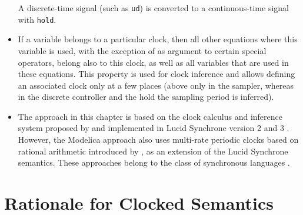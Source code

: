 \begin{itemize}
  A discrete-time signal (such as \lstinline!ud!) is converted to a continuous-time signal with \lstinline!hold!.
\item
  If a variable belongs to a particular clock, then all other equations where this variable is used, with the exception of as argument to certain special operators, belong also to this clock, as well as all variables that are used in these equations.
  This property is used for clock inference and allows defining an associated clock only at a few places (above only in the sampler, whereas in the discrete controller and the hold the sampling period is inferred).
\item
  The approach in this chapter is based on the clock calculus and inference system proposed by \textcite{ColacoPouzet2003ClocksFirstClass} and implemented in Lucid Synchrone version 2 and 3 \parencite{Pouzet2006LucidSynchrone30}.
  However, the Modelica approach also uses multi-rate periodic clocks based on rational arithmetic introduced by \textcite{ForgetEtAl2008MultiPeriodic}, as an extension of the Lucid Synchrone semantics.
  These approaches belong to the class of synchronous languages \parencite{BenvenisteEtAl2003SynchronousTwelveYearsLater}.
\end{itemize}
\section{Rationale for Clocked Semantics}\label{rationale-for-clocked-semantics}

